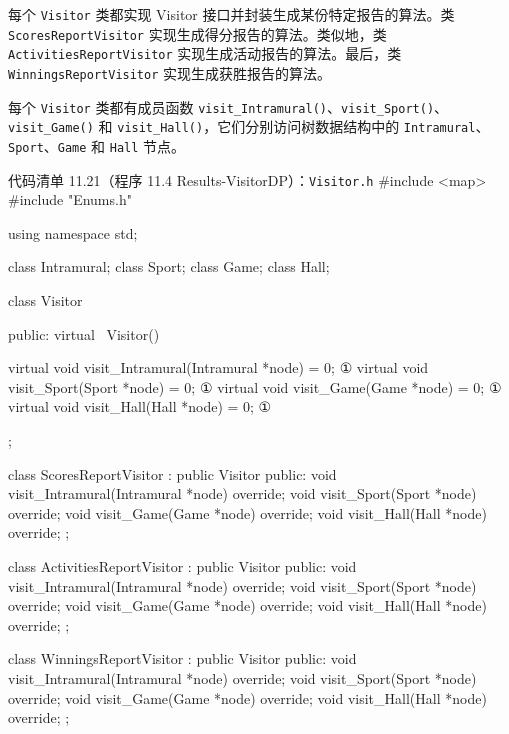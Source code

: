 每个 \texttt{Visitor} 类都实现 Visitor 接口并封装生成某份特定报告的算法。类 \texttt{Scores\allowbreak{}Report\allowbreak{}Visitor} 实现生成得分报告的算法。类似地，类 \texttt{Activities\allowbreak{}Report\allowbreak{}Visitor} 实现生成活动报告的算法。最后，类 \texttt{Winnings\allowbreak{}Report\allowbreak{}Visitor} 实现生成获胜报告的算法。

每个 \texttt{Visitor} 类都有成员函数 \texttt{visit\_\allowbreak{}Intramural(\allowbreak{})\allowbreak{}}、\texttt{visit\_\allowbreak{}Sport(\allowbreak{})\allowbreak{}}、\texttt{visit\_\allowbreak{}Game(\allowbreak{})\allowbreak{}} 和 \texttt{visit\_\allowbreak{}Hall(\allowbreak{})\allowbreak{}}，它们分别访问树数据结构中的 \texttt{Intramural}、\texttt{Sport}、\texttt{Game} 和 \texttt{Hall} 节点。

\begin{codeboxt}{代码清单 11.21（程序 11.4 Results-VisitorDP）：\texttt{Visitor.h}}
#include <map>
#include "Enums.h"

using namespace std;

class Intramural;
class Sport;
class Game;
class Hall;

class Visitor
{
public:
    virtual ~Visitor() {}

    virtual void visit_Intramural(Intramural *node) = 0; ①
    virtual void visit_Sport(Sport *node) = 0;           ①
    virtual void visit_Game(Game *node) = 0;             ①
    virtual void visit_Hall(Hall *node) = 0;             ①
};

class ScoresReportVisitor : public Visitor
{
public:
    void visit_Intramural(Intramural *node) override;
    void visit_Sport(Sport *node) override;
    void visit_Game(Game *node) override;
    void visit_Hall(Hall *node) override;
};

class ActivitiesReportVisitor : public Visitor
{
public:
    void visit_Intramural(Intramural *node) override;
    void visit_Sport(Sport *node) override;
    void visit_Game(Game *node) override;
    void visit_Hall(Hall *node) override;
};

class WinningsReportVisitor : public Visitor
{
public:
    void visit_Intramural(Intramural *node) override;
    void visit_Sport(Sport *node) override;
    void visit_Game(Game *node) override;
    void visit_Hall(Hall *node) override;
};
\end{codeboxt}
\par


